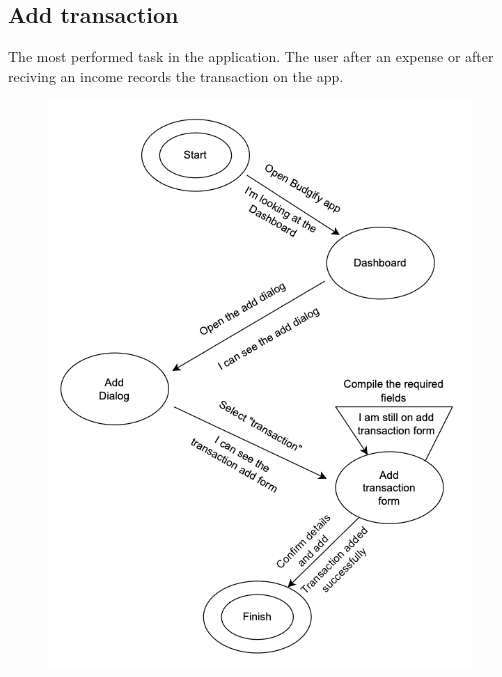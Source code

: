\documentclass[a4paper,12pt]{article}
\begin{document}
\subsection{Add transaction}
The most performed task in the application. The user after an expense or after reciving an income records the transaction on the app.
\begin{figure}[H]
    \centering
    \includegraphics[scale=0.5]{STN1.png}
\end{figure}
\vspace{5cm}
\end{document}
